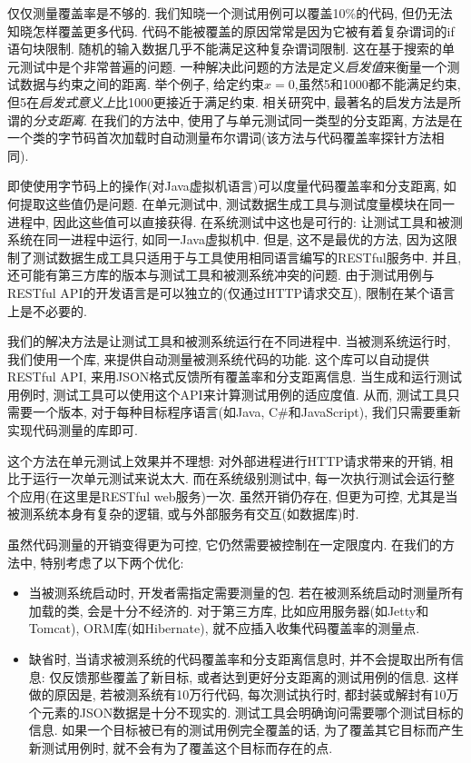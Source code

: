     仅仅测量覆盖率是不够的. 我们知晓一个测试用例可以覆盖10\%的代码, 但仍无法知晓怎样覆盖更多代码. 代码不能被覆盖的原因常常是因为它被有着复杂谓词的if语句块限制. 随机的输入数据几乎不能满足这种复杂谓词限制. 这在基于搜索的单元测试中是个非常普遍的问题\cite{mcminn2004search}. 一种解决此问题的方法是定义\textit{启发值}来衡量一个测试数据与约束之间的距离. 举个例子, 给定约束$x=0$,虽然5和1000都不能满足约束, 但5在\textit{启发式意义上}比1000更接近于满足约束. 相关研究中, 最著名的启发方法是所谓的\textit{分支距离}\cite{korel1990automated}\cite{mcminn2004search}. 在我们的方法中, 使用了与单元测试同一类型的分支距离, 方法是在一个类的字节码首次加载时自动测量布尔谓词(该方法与代码覆盖率探针方法相同). 
    
    即使使用字节码上的操作(对Java虚拟机语言)可以度量代码覆盖率和分支距离, 如何提取这些值仍是问题. 在单元测试中, 测试数据生成工具与测试度量模块在同一进程中, 因此这些值可以直接获得. 在系统测试中这也是可行的: 让测试工具和被测系统在同一进程中运行, 如同一Java虚拟机中. 但是, 这不是最优的方法, 因为这限制了测试数据生成工具只适用于与工具使用相同语言编写的RESTful服务中. 并且, 还可能有第三方库的版本与测试工具和被测系统冲突的问题. 由于测试用例与RESTful API的开发语言是可以独立的(仅通过HTTP请求交互), 限制在某个语言上是不必要的. 
    
    我们的解决方法是让测试工具和被测系统运行在不同进程中. 当被测系统运行时, 我们使用一个库, 来提供自动测量被测系统代码的功能. 这个库可以自动提供RESTful API, 来用JSON格式反馈所有覆盖率和分支距离信息. 当生成和运行测试用例时, 测试工具可以使用这个API来计算测试用例的适应度值. 从而, 测试工具只需要一个版本, 对于每种目标程序语言(如Java, C\#和JavaScript), 我们只需要重新实现代码测量的库即可. 
    
    这个方法在单元测试上效果并不理想: 对外部进程进行HTTP请求带来的开销, 相比于运行一次单元测试来说太大. 而在系统级别测试中, 每一次执行测试会运行整个应用(在这里是RESTful web服务)一次. 虽然开销仍存在, 但更为可控, 尤其是当被测系统本身有复杂的逻辑, 或与外部服务有交互(如数据库)时. 
    
    虽然代码测量的开销变得更为可控, 它仍然需要被控制在一定限度内. 在我们的方法中, 特别考虑了以下两个优化: 
    
    \begin{itemize}
      \item 当被测系统启动时, 开发者需指定需要测量的包. 若在被测系统启动时测量所有加载的类, 会是十分不经济的. 对于第三方库, 比如应用服务器(如Jetty和Tomcat), ORM库(如Hibernate), 就不应插入收集代码覆盖率的测量点. 
        
        \item 缺省时, 当请求被测系统的代码覆盖率和分支距离信息时, 并不会提取出所有信息: 仅反馈那些覆盖了新目标, 或者达到更好分支距离的测试用例的信息. 这样做的原因是, 若被测系统有10万行代码, 每次测试执行时, 都封装或解封有10万个元素的JSON数据是十分不现实的. 测试工具会明确询问需要哪个测试目标的信息. 如果一个目标被已有的测试用例完全覆盖的话, 为了覆盖其它目标而产生新测试用例时, 就不会有为了覆盖这个目标而存在的点. 
    \end{itemize}
    

